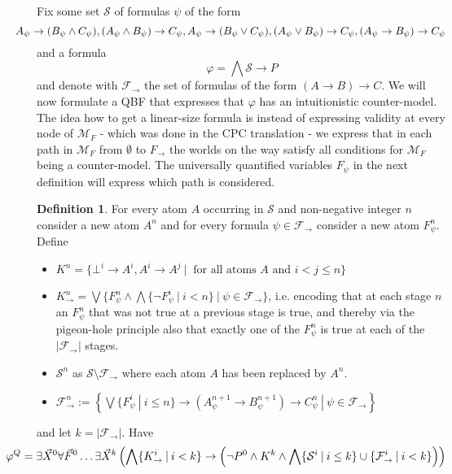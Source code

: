 \documentclass[a4paper,12pt]{report}
\theoremstyle{definition}
\theoremstyle{definition}
\theoremstyle{definition}
\theoremstyle{definition}
\theoremstyle{definition}
\newtheorem{definition}[theorem]{Definition}
\theoremstyle{definition}
\theoremstyle{definition}
\begin{document}
	 Fix some set $\mathcal S$ of formulas $\psi$ of the form $$\hspace*{-.7cm}A_\psi\to (B_\psi\wedge C_\psi), (A_\psi\wedge B_\psi)\to C_\psi, A_\psi\to (B_\psi\vee C_\psi), (A_\psi\vee B_\psi)\to C_\psi, (A_\psi\to B_\psi)\to C_\psi$$and a formula $$\varphi = \bigwedge \mathcal S\to P$$
	and denote with $\mathcal F_\to$ the set of formulas of the form $(A\to B)\to C$. We will now formulate a QBF that expresses that $\varphi$ has an intuitionistic counter-model. The idea how to get a linear-size formula is instead of expressing validity at every node of $\mathcal M_F$ - which was done in the CPC translation - we express that in each path in $\mathcal M_F$ from $\emptyset$ to $F_\to$ the worlds on the way satisfy all conditions for $\mathcal M_F$ being a counter-model. The universally quantified variables $F_\psi$ in the next definition will express which path is considered.
	
	\begin{definition}
		For every atom $A$ occurring in $\mathcal S$ and non-negative integer $n$ consider a new atom $A^n$ and for every formula $\psi\in\mathcal F_\to$ consider a new atom $F_\psi^n$. Define
		\begin{itemize}
			\item $K^n = \{\bot^i\to A^i, A^i\to A^j\:|\:\text{ for all atoms $A$ and $i < j\leq n$}\}$
			\item $K_\to^n = \bigvee \{F_\psi^{n}\wedge\bigwedge\{\neg F^i_\psi\:|\:i<n\}\:|\:\psi\in\mathcal F_\to\}$, i.e. encoding that at each stage $n$ an $F_\psi^{n}$ that was not true at a previous stage is true, and thereby via the pigeon-hole principle also that exactly one of the $F_\psi^{n}$ is true at each of the $|\mathcal F_\to|$ stages.
			\item $\mathcal S^n$ as $\mathcal S\setminus\mathcal F_\to$ where each atom $A$ has been replaced by $A^n$.
			\item $\mathcal F_\to^n:=\left\{\bigvee\{F_\psi^i\:|\:i \leq n\}\to (A^{n+1}_\psi\to B^{n+1}_\psi)\to C^n_\psi\:|\:\psi\in\mathcal F_\to\right\}$
		\end{itemize}
		and let $k = |\mathcal F_\to|$. Have
		$$\hspace*{-1cm}\varphi^Q = \exists \vec X^0\forall\vec F^0\dots\exists \vec X^k\left(\bigwedge \{K^{i}_\to\:|\:i < k\}\to\left(\neg P^0\wedge K^k\wedge\bigwedge\{\mathcal S^i\:|\:i\leq k\}\cup\{\mathcal F^i_\to\:|\: i< k\}\right)\right)$$
	\end{definition}
	
\end{document}
